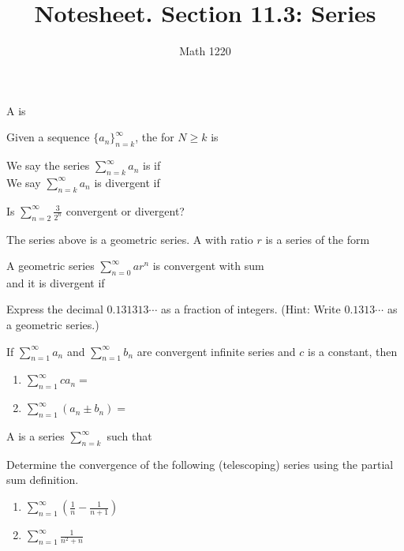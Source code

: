 \documentclass[12pt, a4paper]{article}
\author{Math 1220}
\title{Notesheet. Section 11.3: Series}
\date{}
\begin{document}
\maketitle
\nameline
\begin{defi}
  A  is
\end{defi}
\begin{defi}
  Given a sequence \(\{a_n\}_{n=k}^\infty\), the  for \(N \geq k\) is \\
\end{defi}
\begin{defi}
  We say the series \(\sum_{n=k}^\infty a_n\) is  if \\

  We say \(\sum_{n=k}^\infty a_n\) is divergent if 
\end{defi}
\begin{ex}
  Is \(\sum_{n=2}^\infty \frac{3}{2^n}\) convergent or divergent?
\end{ex}
\begin{defi}
  The series above is a geometric series. A  with
  ratio \(r\) is a series of the form
\end{defi}
\begin{thrm}
  A geometric series \(\sum_{n=0}^\infty ar^n\) is convergent with sum
  \\

  and it is divergent if 
\end{thrm}
\vspace{-1in}
\begin{ex}
  Express the decimal \(0.131313\cdots\) as a fraction of
  integers. (Hint: Write \(0.1313\cdots\) as a geometric series.)
\end{ex}
\begin{thrm}
  If \(\sum_{n=1}^\infty a_n\) and \(\sum_{n=1}^\infty b_n\) are
  convergent infinite series and \(c\) is a constant, then
  \begin{enumerate}
  \item \(\sum_{n=1}^\infty ca_n = \)
  \item \(\sum_{n=1}^\infty (a_n \pm b_n) = \)
  \end{enumerate}
\end{thrm}
\vspace{-1in}
\begin{defi}
  A  is a series \(\sum_{n=k}^\infty\) such that
\end{defi}
\begin{ex}
  Determine the convergence of the following (telescoping) series using
  the partial 
  sum definition.
  \begin{enumerate}
  \item \(\sum_{n=1}^\infty \left( \frac{1}{n} - \frac{1}{n+1}
    \right)\)
    \vspace{1in}
  \item \(\sum_{n=1}^\infty \frac{1}{n^2+n}\)
  \end{enumerate}
\end{ex}
\vspace{-1.5in}
\end{document}
